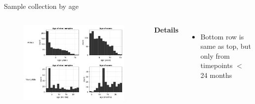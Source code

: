 \begin{frame}{Sample collection by age}
    \begin{columns}[c] %

    
        \begin{figure}
        \includegraphics[width=1\linewidth]{../figures/age_hists}
        \end{figure}

    
        \textbf{Details}
        \begin{itemize}
            \item Bottom row is same as top, but only from timepoints $<$ 24 months
        \end{itemize}

    \end{columns}

\end{frame}


